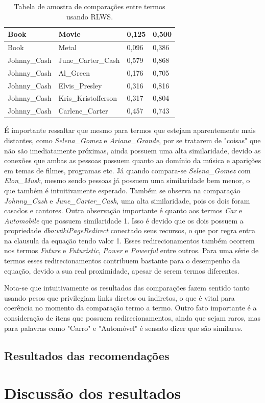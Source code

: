 \begin{table}[H]
\begin{tabular}{|l|l|l|l|}
Book             & Movie               & 0,125                   & 0,500                   \\ \hline
Book             & Metal               & 0,096                   & 0,386                   \\ \hline
Johnny\_Cash     & June\_Carter\_Cash  & 0,579                   & 0,868                   \\ \hline
Johnny\_Cash     & Al\_Green           & 0,176                   & 0,705                   \\ \hline
Johnny\_Cash     & Elvis\_Presley      & 0,316                   & 0,816                   \\ \hline
Johnny\_Cash     & Kris\_Kristofferson & 0,317                   & 0,804                   \\ \hline
Johnny\_Cash     & Carlene\_Carter     & 0,457                   & 0,743                   \\ \hline
\end{tabular}
\caption{Tabela de amostra de comparações entre termos usando \ac{RLWS}.}
\label{tab:rlws_results}
\end{table}

É importante ressaltar que mesmo para termos que estejam aparentemente mais distantes, como \textit{Selena\_Gomez} e \textit{Ariana\_Grande}, por se tratarem de "coisas" que não são imediatamente próximas, ainda possuem uma alta similaridade, devido as conexões que ambas as pessoas possuem quanto ao domínio da música e aparições em temas de filmes, programas etc. Já quando compara-se \textit{Selena\_Gomez} com \textit{Elon\_Musk}, mesmo sendo pessoas já possuem uma similaridade bem menor, o que também é intuitivamente esperado. Também se observa na comparação \textit{Johnny\_Cash} e \textit{June\_Carter\_Cash}, uma alta similaridade, pois os dois foram casados e cantores. Outra observação importante é quanto aos termos \textit{Car} e \textit{Automobile} que possuem similaridade 1. Isso é devido que os dois possuem a propriedade \textit{dbo:wikiPageRedirect} conectado seus recursos, o que por regra entra na clausula da equação tendo valor 1. Esses redirecionamentos também ocorrem nos  termos \textit{Future} e \textit{Futuristic}, \textit{Power} e \textit{Powerful} entre outros. Para uma série de termos esses redirecionamentos contribuem bastante para o desempenho da equação, devido a sua real proximidade, apesar de serem termos diferentes.

Nota-se que intuitivamente os resultados das comparações fazem sentido tanto usando pesos que privilegiam links diretos ou indiretos, o que é vital para coerência no momento da comparação termo a termo. Outro fato importante é a consideração de itens que possuem redirecionamentos, ainda que sejam raros, mas para palavras como "Carro" e "Automóvel" é sensato dizer que são similares.

\subsection{Resultados das recomendações}

\section{Discussão dos resultados}
